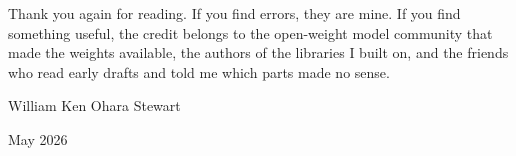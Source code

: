 \documentclass[11pt]{article}
\begin{document}
\vspace{14pt}

\noindent Thank you again for reading. If you find errors, they are mine. If you
find something useful, the credit belongs to the open-weight model community that
made the weights available, the authors of the libraries I built on, and the
friends who read early drafts and told me which parts made no sense.

\vspace{8pt}

\begin{flushright}
William Ken Ohara Stewart

May 2026
\end{flushright}
\end{document}

